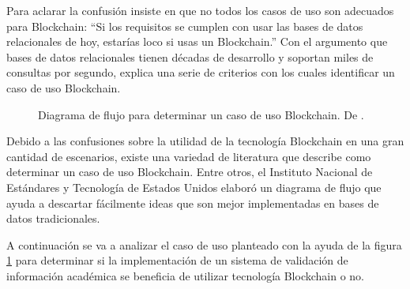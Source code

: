 Para aclarar la confusión insiste en que no todos los casos de uso son adecuados para Blockchain: ``Si los requisitos se cumplen con usar las bases de datos relacionales de hoy, estarías loco si usas un Blockchain.'' Con el argumento que bases de datos relacionales tienen décadas de desarrollo y soportan miles de consultas por segundo, explica una serie de criterios con los cuales identificar un caso de uso Blockchain.

\begin{figure}[H] %
    \caption{Diagrama de flujo para determinar un caso de uso Blockchain. De \cite{nist}.}
    \label{fig:use_case_diagram}
\end{figure}

Debido a las confusiones sobre la utilidad de la tecnología Blockchain en una gran cantidad de escenarios, existe una variedad de literatura que describe como determinar un caso de uso Blockchain. Entre otros, el Instituto Nacional de Estándares y Tecnología de Estados Unidos elaboró un diagrama de flujo que ayuda a descartar fácilmente ideas que son mejor implementadas en bases de datos tradicionales.

A continuación se va a analizar el caso de uso planteado con la ayuda de la figura \ref{fig:use_case_diagram} para determinar si la implementación de un sistema de validación de información académica se beneficia de utilizar tecnología Blockchain o no.

